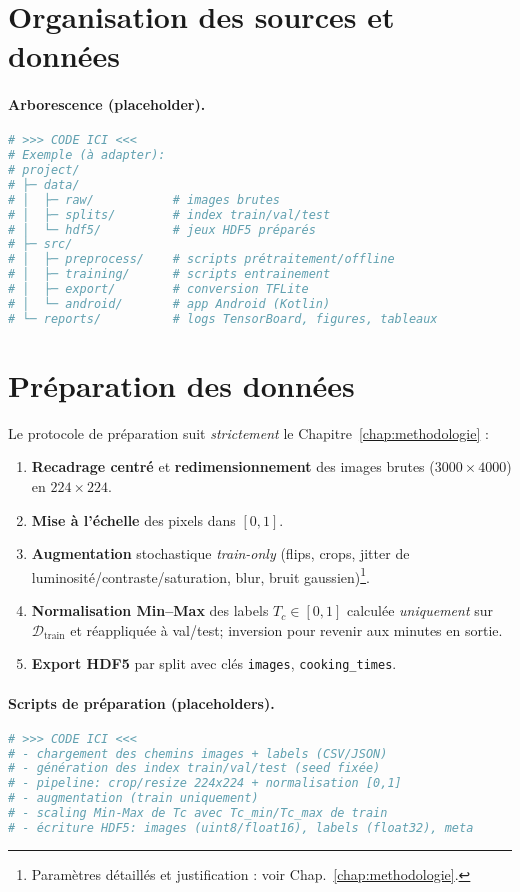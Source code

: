 \section{Organisation des sources et données}
\label{sec:orga_sources}

\paragraph{Arborescence (placeholder).}
\begin{lstlisting}[language=bash,caption={(Placeholder) Arborescence du projet},label={lst:tree}]
# >>> CODE ICI <<<
# Exemple (à adapter):
# project/
# ├─ data/
# │  ├─ raw/           # images brutes
# │  ├─ splits/        # index train/val/test
# │  └─ hdf5/          # jeux HDF5 préparés
# ├─ src/
# │  ├─ preprocess/    # scripts prétraitement/offline
# │  ├─ training/      # scripts entrainement
# │  ├─ export/        # conversion TFLite
# │  └─ android/       # app Android (Kotlin)
# └─ reports/          # logs TensorBoard, figures, tableaux
\end{lstlisting}

\section{Préparation des données}
\label{sec:pretraitement}

Le protocole de préparation suit \textit{strictement} le Chapitre~\ref{chap:methodologie} :
\begin{enumerate}
    \item \textbf{Recadrage centré} et \textbf{redimensionnement} des images brutes (\(3000\times4000\)) en \(224\times224\).
    \item \textbf{Mise à l’échelle} des pixels dans \([0,1]\).
    \item \textbf{Augmentation} stochastique \textit{train-only} (flips, crops, jitter de luminosité/contraste/saturation, blur, bruit gaussien)\footnote{Paramètres détaillés et justification : voir Chap.~\ref{chap:methodologie}.}.
    \item \textbf{Normalisation Min--Max} des labels \(T_c\in[0,1]\) calculée \emph{uniquement} sur \(\mathcal{D}_{\text{train}}\) et réappliquée à val/test; inversion pour revenir aux minutes en sortie.
    \item \textbf{Export HDF5} par split avec clés \texttt{images}, \texttt{cooking\_times}.
\end{enumerate}

\paragraph{Scripts de préparation (placeholders).}
\begin{lstlisting}[language=Python,caption={(Placeholder) Génération des splits et export HDF5},label={lst:prep_hdf5}]
# >>> CODE ICI <<<
# - chargement des chemins images + labels (CSV/JSON)
# - génération des index train/val/test (seed fixée)
# - pipeline: crop/resize 224x224 + normalisation [0,1]
# - augmentation (train uniquement)
# - scaling Min-Max de Tc avec Tc_min/Tc_max de train
# - écriture HDF5: images (uint8/float16), labels (float32), meta
\end{lstlisting}

